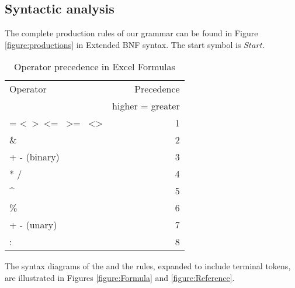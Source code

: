 \documentclass[conference]{IEEEtran}
\begin{document}
\subsection{Syntactic analysis}
\label{subsection:productionRules}

The complete production rules of our grammar can be found in Figure \ref{figure:productions} in Extended BNF syntax. The start symbol is $Start$.

\begin{table}
\label{table:operatorprec}
\caption{Operator precedence in Excel Formulas}
\begin{tabular}{lr}
Operator                                                                & Precedence \\
 & higher = greater \\
= \textless \  \textgreater \  \textless= \  \textgreater= \  \textless\textgreater & 1          \\
\&                                                                      & 2          \\
+ - (binary)                                                            & 3          \\
* /                                                                     & 4          \\
\textasciicircum                                                        & 5          \\
\%                                                                      & 6          \\
+ - (unary)                                                             & 7          \\
: \texttt{\char32}                                                             & 8         
\end{tabular}
\end{table}

The syntax diagrams of the  and the  rules, expanded to include terminal tokens, are illustrated in Figures \ref{figure:Formula} and \ref{figure:Reference}.
\end{document}
